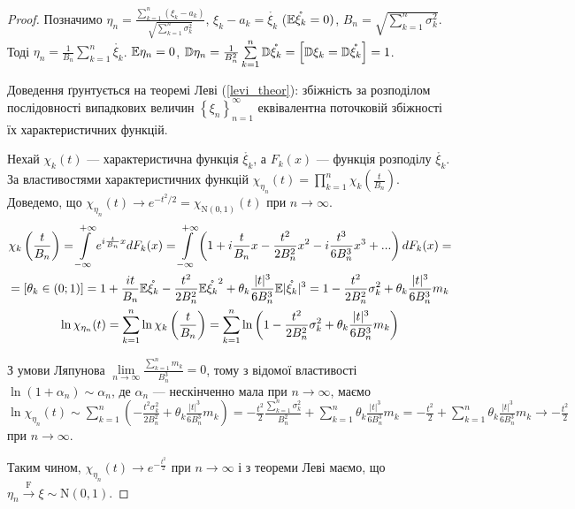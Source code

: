 \begin{proof}
    Позначимо $\eta_n = \frac{\sum\limits_{k=1}^n (\xi_k - a_k)}
    {\sqrt{\sum\limits_{k=1}^n \sigma_k^2}}$, $\xi_k - a_k = \mathring{\xi_k}$ ($\mathbb{E}\mathring{\xi_k} = 0)$, 
    $B_n = \sqrt{\sum\limits_{k=1}^n \sigma_k^2}$. 
    Тоді $\eta_n = \frac{1}{B_n}\sum\limits_{k=1}^n \mathring{\xi_k}$.
    $\mathbb{E}\eta_n = 0$, $\mathbb{D}\eta_n = \frac{1}{B_n^2}\sum\limits_{k=1}^n \mathbb{D}\mathring{\xi_k} = 
    \left[\mathbb{D}\xi_k = \mathbb{D}\mathring{\xi_k}\right] = 1$.

    Доведення ґрунтується на теоремі Леві (\ref{levi_theor}): збіжність за розподілом послідовності 
    випадкових величин $\left\{ \xi_n\right\}_{n=1}^{\infty}$ еквівалентна поточковій збіжності їх
    характеристичних функцій.

    Нехай $\chi_k(t)$ --- характеристична функція $\mathring{\xi_k}$, а $F_k(x)$ --- 
    функція розподілу $\mathring{\xi_k}$.
    За властивостями характеристичних функцій $\chi_{\eta_n}(t) = 
    \prod\limits_{k=1}^n \chi_k(\frac{t}{B_n})$. 
    Доведемо, що $\chi_{\eta_n}(t)\to e^{-t^2/2} = 
    \chi_{\mathrm{N}(0, 1)}(t)$ при $ n \to \infty$.
    \begin{gather*}\chi_k\left(\frac{t}{B_n}\right) = \int\limits_{-\infty}^{+\infty} e^{i\frac{t}{B_n}x} dF_k(x) = 
    \int\limits_{-\infty}^{+\infty} \left(1 + i\frac{t}{B_n}x - \frac{t^2}{2B_n^2}x^2 - 
    i\frac{t^3}{6B_n^3}x^3 + ...\right) dF_k(x) = \\ = \left[\theta_k \in (0; 1)\right]
    = 1 + \frac{it}{B_n}\mathbb{E}\mathring{\xi_k} - \frac{t^2}{2B_n^2}
    \mathbb{E}\mathring{\xi_k}^2 + \theta_k\frac{|t|^3}{6B_n^3}\mathbb{E}|\mathring{\xi_k}|^3 = 
    1 - \frac{t^2}{2B_n^2}\sigma_k^2 + \theta_k\frac{|t|^3}{6B_n^3}m_k \\
    \ln\chi_{\eta_n}(t) = \sum\limits_{k=1}^n \ln \chi_k \left(\frac{t}{B_n}\right) = 
    \sum\limits_{k=1}^n \ln\left(1 - \frac{t^2}{2B_n^2}\sigma_k^2 + 
    \theta_k\frac{|t|^3}{6B_n^3}m_k\right)
    \end{gather*}

    З умови Ляпунова $\underset{n \rightarrow \infty}{\lim} \frac{\sum\limits_{k=1}^n m_k}{B_n^3} = 0$, 
    тому з відомої властивості $\ln(1 + \alpha_n) \sim \alpha_n$, де $\alpha_n$ --- нескінченно мала при 
    $n \rightarrow \infty$, маємо $\ln\chi_{\eta_n}(t) \sim \sum\limits_{k=1}^n\left(
        -\frac{t^2\sigma^2_k}{2B_n^2} + \theta_k\frac{|t|^3}{6B_n^3}m_k
    \right) 
    = -\frac{t^2}{2}\frac{\sum\limits_{k=1}^n\sigma_k^2}{B_n^2} + \sum\limits_{k=1}^n \theta_k\frac{|t|^3}{6B_n^3}m_k= -\frac{t^2}{2} 
    + \sum\limits_{k=1}^n \theta_k\frac{|t|^3}{6B_n^3}m_k \to -\frac{t^2}{2} 
    $ при $n \rightarrow \infty$.
    
    Таким чином, $\chi_{\eta_n}(t) \to e^{-\frac{t^2}{2}}$ при $n \rightarrow \infty$ і 
    з теореми Леві маємо, що $\eta_n \overset{\mathrm{F}}{\longrightarrow} \xi \sim \mathrm{N}(0, 1)$.
\end{proof}
